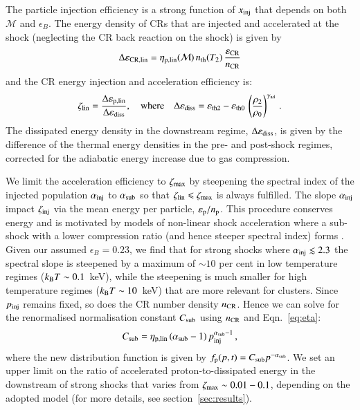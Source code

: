 \documentclass[fleqn,usenatbib,useAMS]{mnras}
\newcommand{\eb}{\epsilon_B}
\newcommand{\p}{\rmn{p}}
\newcommand{\kB}{k_{\rmn{B}}}
\newcommand{\eps}{\varepsilon}
\newcommand{\CR}{\rmn{CR}}
\begin{document}
The particle injection efficiency is a strong function of
$x_{\mathrm{inj}}$ that depends on both $\mathcal{M}$ and $\eb$. The
energy density of CRs that are injected and accelerated at the shock
(neglecting the CR back reaction on the shock) is given by
\begin{equation}
\label{eq:CR_energy} 
  \Delta\eps_\rmn{CR,lin} =
  \eta_\rmn{p,lin}(\mathcal{M})\,n_\rmn{th}(T_2)
  \,\frac{\eps_\CR}{n_\CR}
\end{equation}
and the CR energy injection and acceleration efficiency is:
\begin{equation}
  \zeta_\rmn{lin} =
  \frac{\Delta\eps_\rmn{p,lin}}{\Delta\eps_\rmn{diss}},
   \quad\mbox{where}\quad
  \Delta\eps_\rmn{diss} = \eps_\rmn{th2} - \eps_\rmn{th0}\,\left(\frac{\rho_2}{\rho_0}\right)^{\gamma_\rmn{ad}}\,.
\label{eqn:energy_frac}  
\end{equation}
The dissipated energy density in the downstream regime,
$\Delta\eps_\rmn{diss}$, is given by the difference of the thermal
energy densities in the pre- and post-shock regimes, corrected for the
adiabatic energy increase due to gas compression.

We limit the acceleration efficiency to $\zeta_{\mathrm{max}}$ by
steepening the spectral index of the injected population
$\alpha_{\mathrm{inj}}$ to $\alpha_{\mathrm{sub}}$ so that $\zeta_{\mathrm{lin}}
\leqslant \zeta_{\mathrm{max}}$ is always fulfilled. The slope
$\alpha_{\mathrm{inj}}$ impact $\zeta_{\mathrm{inj}}$ via the mean energy per
particle, $\eps_\rmn{p}/n_\rmn{p}$. This
procedure conserves energy and is motivated by models of non-linear
shock acceleration where a sub-shock with a lower compression ratio
(and hence steeper spectral index) forms
\citep[e.g.,][]{2000ApJ...540..292E}. Given our assumed $\eb=0.23$, we
find that for strong shocks where $\alpha_{{\mathrm{inj}}} \lesssim 2.3$ the spectral
slope is steepened by a maximum of $\sim 10$ per cent in low
temperature regimes ($\kB T\sim 0.1$~keV), while the steepening is much
smaller for high temperature regimes ($\kB T\sim 10$~keV) that are more
relevant for clusters. Since $p_{\mathrm{inj}}$ remains fixed, so does the
CR number density $n_\CR$. Hence we can solve for the
renormalised normalisation constant $C_{\mathrm{sub}}$ using $n_\CR$
and Eqn.~\ref{eq:eta}:
\begin{equation}
  \label{eq:Cp_sub}
  C_{\mathrm{sub}}=\eta_{\mathrm{p,lin}}\,(\alpha_{\mathrm{sub}}-1)\,p_{\mathrm{inj}}^{\alpha_{\mathrm{sub}}-1}\,,
\end{equation}
where the new distribution function is given by $f_\p(p,t)= C_\rmn{sub}
p^{-\alpha_\rmn{sub}}$. We set an upper limit on the ratio of
accelerated proton-to-dissipated energy in the downstream of strong
shocks that varies from $\zeta_{\mathrm{max}} \sim 0.01-0.1$, depending on
the adopted model (for more details, see section~\ref{sec:results}).
\end{document}
